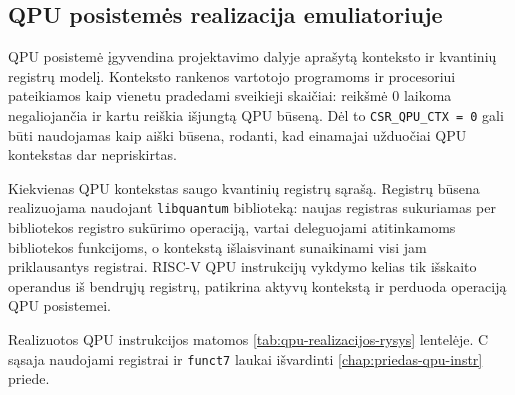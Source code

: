 \subsection{QPU posistemės realizacija emuliatoriuje}
\label{sec:qpu-realizacija}

QPU posistemė įgyvendina projektavimo dalyje aprašytą konteksto ir kvantinių registrų modelį. Konteksto rankenos vartotojo programoms ir procesoriui pateikiamos kaip vienetu pradedami sveikieji skaičiai: reikšmė 0 laikoma negaliojančia ir kartu reiškia išjungtą QPU būseną. Dėl to \texttt{CSR\_QPU\_CTX = 0} gali būti naudojamas kaip aiški būsena, rodanti, kad einamajai užduočiai QPU kontekstas dar nepriskirtas.

Kiekvienas QPU kontekstas saugo kvantinių registrų sąrašą. Registrų būsena realizuojama naudojant \texttt{libquantum} biblioteką: naujas registras sukuriamas per bibliotekos registro sukūrimo operaciją, vartai deleguojami atitinkamoms bibliotekos funkcijoms, o kontekstą išlaisvinant sunaikinami visi jam priklausantys registrai. RISC-V QPU instrukcijų vykdymo kelias tik išskaito operandus iš bendrųjų registrų, patikrina aktyvų kontekstą ir perduoda operaciją QPU posistemei.

Realizuotos QPU instrukcijos matomos \ref{tab:qpu-realizacijos-rysys} lentelėje. C sąsaja naudojami registrai ir \texttt{funct7} laukai išvardinti \ref{chap:priedas-qpu-instr} priede.

